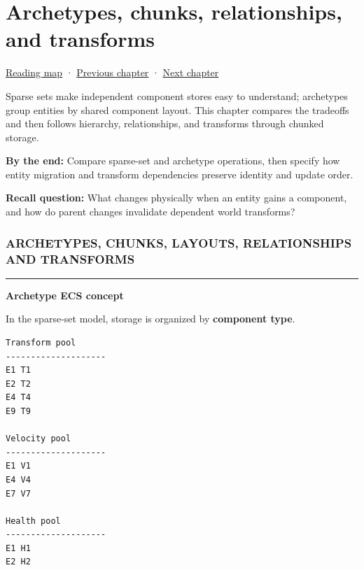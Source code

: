 \chapter{Archetypes, chunks, relationships, and transforms}\label{05-engine-i-ch016-archetypes-chunks-relationships-and-transforms}\hypertarget{05-engine-i-ch016}{}\label{stagechapter:05-engine-i-ch016}

\hypertarget{05-engine-i-ch016-archetypes-chunks-relationships-and-transforms}{}

\hyperref[volume-reading-map]{Reading map} · \hyperref[05-engine-i-ch015-sparse-set-components-and-generational-entity-handles]{Previous chapter} · \hyperref[05-engine-i-ch017-ecs-performance-through-cache-and-scheduling]{Next chapter}

Sparse sets make independent component stores easy to understand; archetypes group entities by shared component layout. This chapter compares the tradeoffs and then follows hierarchy, relationships, and transforms through chunked storage.

\textbf{By the end:} Compare sparse-set and archetype operations, then specify how entity migration and transform dependencies preserve identity and update order.

\textbf{Recall question:} What changes physically when an entity gains a component, and how do parent changes invalidate dependent world transforms?

\subsection{ARCHETYPES, CHUNKS, LAYOUTS, RELATIONSHIPS AND TRANSFORMS}\label{05-engine-i-ch016-archetypes-chunks-layouts-relationships-and-transforms}

\hypertarget{05-engine-i-ch016-archetypes-chunks-layouts-relationships-and-transforms}{}

\begin{center}\rule{0.5\linewidth}{0.5pt}\end{center}

\textbf{Archetype ECS concept}

In the sparse-set model, storage is organized by \textbf{component type}.

\begin{verbatim}
Transform pool
--------------------
E1 T1
E2 T2
E4 T4
E9 T9

Velocity pool
--------------------
E1 V1
E4 V4
E7 V7

Health pool
--------------------
E1 H1
E2 H2
\end{verbatim}

